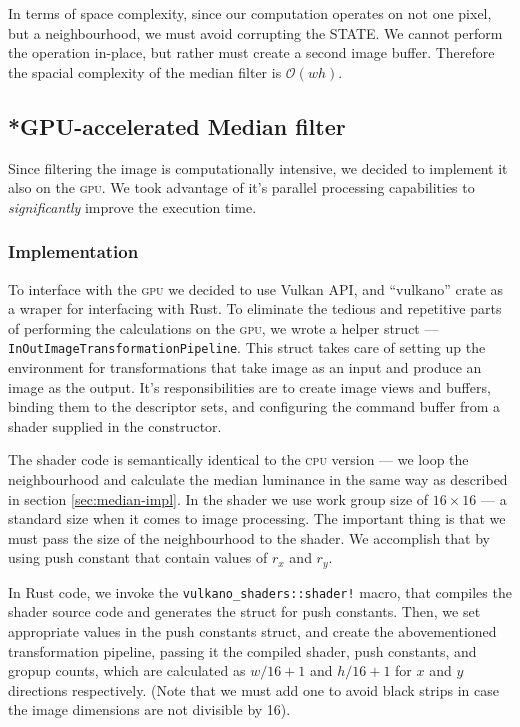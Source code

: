 \documentclass[12pt]{article}
\begin{document}
In terms of space complexity, since our computation operates on not one pixel, but a neighbourhood, we must avoid corrupting the STATE.
We cannot perform the operation in-place, but rather must create a second image buffer.
Therefore the spacial complexity of the median filter is $\mathcal{O}(wh)$.

\subsection{*GPU-accelerated Median filter}

Since filtering the image is computationally intensive, we decided to implement it also on the \textsc{gpu}.
We took advantage of it's parallel processing capabilities to \emph{significantly} improve the execution time.

\subsubsection{Implementation}\label{sec:median-gpu-impl}

To interface with the \textsc{gpu} we decided to use Vulkan API,
and ``vulkano'' crate as a wraper for interfacing with Rust.
To eliminate the tedious and repetitive parts of performing the calculations on the \textsc{gpu},
we wrote a helper struct --- \lstinline{InOutImageTransformationPipeline}.
This struct takes care of setting up the environment for transformations that take image as an input and produce an image as the output.
It's responsibilities are to create image views and buffers, binding them to the descriptor sets, and configuring the command buffer from a shader supplied in the constructor.

The shader code is semantically identical to the \textsc{cpu} version ---
we loop the neighbourhood and calculate the median luminance in the same way as described in section \ref{sec:median-impl}.
In the shader we use work group size of $16\times16$ --- a standard size when it comes to image processing.
The important thing is that we must pass the size of the neighbourhood to the shader.
We accomplish that by using push constant that contain values of $r_x$ and $r_y$.

In Rust code, we invoke the \lstinline{vulkano_shaders::shader!} macro, that compiles the shader source code and generates the struct for push constants.
Then, we set appropriate values in the push constants struct, and create the abovementioned transformation pipeline,
passing it the compiled shader, push constants, and gropup counts, which are calculated as $w / 16 + 1$ and $h / 16 + 1$ for $x$ and $y$ directions respectively.
(Note that we must add one to avoid black strips in case the image dimensions are not divisible by 16).
\end{document}
